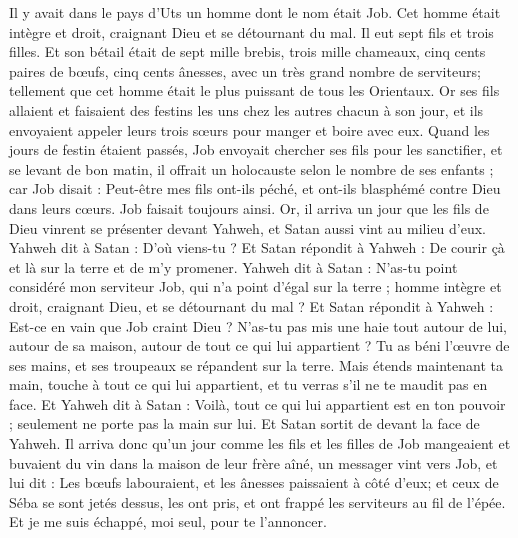 \begin{multicols}{2}
\VerseOne{}Il y avait dans le pays d'Uts un homme dont le nom était Job. Cet homme était intègre et droit, craignant Dieu et se détournant du mal.
Il eut sept fils et trois filles.
Et son bétail était de sept mille brebis, trois mille chameaux, cinq cents paires de bœufs, cinq cents ânesses, avec un très grand nombre de serviteurs; tellement que cet homme était le plus puissant de tous les Orientaux.
Or ses fils allaient et faisaient des festins les uns chez les autres chacun à son jour, et ils envoyaient appeler leurs trois sœurs pour manger et boire avec eux.
Quand les jours de festin étaient passés, Job envoyait chercher ses fils pour les sanctifier, et se levant de bon matin, il offrait un holocauste selon le nombre de ses enfants ; car Job disait : Peut-être mes fils ont-ils péché, et ont-ils blasphémé contre Dieu dans leurs cœurs. Job faisait toujours ainsi.
Or, il arriva un jour que les fils de Dieu vinrent se présenter devant Yahweh, et Satan aussi vint au milieu d'eux.
Yahweh dit à Satan : D'où viens-tu ? Et Satan répondit à Yahweh : De courir çà et là sur la terre et de m'y promener.
Yahweh dit à Satan : N'as-tu point considéré mon serviteur Job, qui n'a point d'égal sur la terre ; homme intègre et droit, craignant Dieu, et se détournant du mal ?
Et Satan répondit à Yahweh : Est-ce en vain que Job craint Dieu ?
N'as-tu pas mis une haie  tout autour de lui, autour de sa maison, autour de tout ce qui lui appartient ? Tu as béni l'œuvre de ses mains, et ses troupeaux se répandent sur la terre.
Mais étends maintenant ta main, touche à tout ce qui lui appartient, et tu verras s'il ne te maudit pas en face.
Et Yahweh dit à Satan : Voilà, tout ce qui lui appartient est en ton pouvoir ; seulement ne porte pas la main sur lui. Et Satan sortit de devant la face de Yahweh.
Il arriva donc qu'un jour comme les fils et les filles de Job mangeaient et buvaient du vin dans la maison de leur frère aîné, un messager vint vers Job,
et lui dit : Les bœufs labouraient, et les ânesses paissaient à côté d'eux;
et ceux de Séba se sont jetés dessus, les ont pris, et ont frappé les serviteurs au fil de l'épée. Et je me suis échappé, moi seul, pour te l'annoncer.

\end{multicols}
